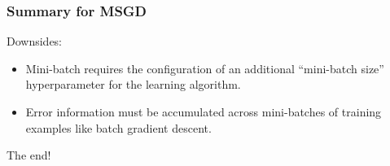 \documentclass[cjk]{beamer}
\begin{document}
\begin{CJK*}{GBK}{kai}
\begin{frame}
\frametitle{Summary for MSGD}
Downsides:
\begin{itemize}
	\item Mini-batch requires the configuration of an additional “mini-batch size” hyperparameter for the learning algorithm.
	\item Error information must be accumulated across mini-batches of training examples like batch gradient descent.
\end{itemize}
\end{frame}

\begin{frame}
\begin{center}
\huge The end!
\end{center}
\end{frame}
%

\end{CJK*}
\end{document}
